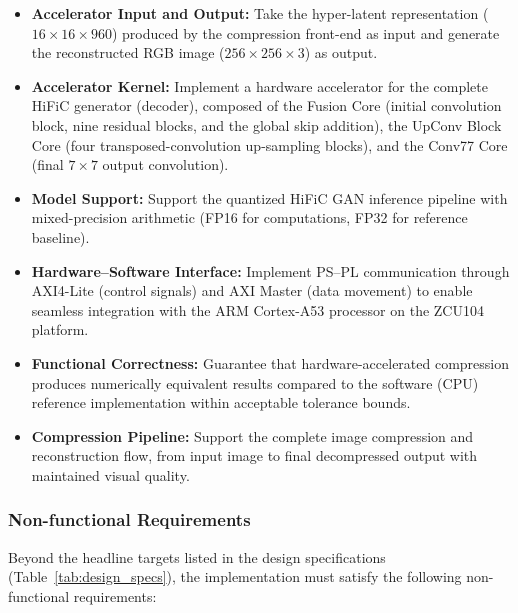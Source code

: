 \begin{itemize}
    \item \textbf{Accelerator Input and Output:} Take the hyper-latent representation ($16 \times 16 \times 960$) produced by the compression front-end as input and generate the reconstructed RGB image ($256 \times 256 \times 3$) as output.
    \item \textbf{Accelerator Kernel:} Implement a hardware accelerator for the complete HiFiC generator (decoder), composed of the Fusion Core (initial convolution block, nine residual blocks, and the global skip addition), the UpConv Block Core (four transposed-convolution up-sampling blocks), and the Conv77 Core (final $7\times7$ output convolution).
    \item \textbf{Model Support:} Support the quantized HiFiC GAN inference pipeline with mixed-precision arithmetic (FP16 for computations, FP32 for reference baseline).
    \item \textbf{Hardware--Software Interface:} Implement PS--PL communication through AXI4-Lite (control signals) and AXI Master (data movement) to enable seamless integration with the ARM Cortex-A53 processor on the ZCU104 platform.
    \item \textbf{Functional Correctness:} Guarantee that hardware-accelerated compression produces numerically equivalent results compared to the software (CPU) reference implementation within acceptable tolerance bounds.
    \item \textbf{Compression Pipeline:} Support the complete image compression and reconstruction flow, from input image to final decompressed output with maintained visual quality.
\end{itemize}

\subsubsection{Non-functional Requirements}

Beyond the headline targets listed in the design specifications (Table~\ref{tab:design_specs}), the implementation must satisfy the following non-functional requirements:


